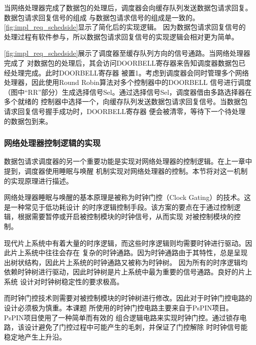 当网络处理器完成了数据包的处理后，调度器会向缓存队列发送数据包请求回复。数据包请求回复信号的组成
与数据包请求信号的组成是一致的。\autoref{fig:impl_req_schedside}显示了简化后的实现逻辑。
因为数据包请求回复信号的处理过程有软件参与，所以数据包请求回复信号的实现逻辑会相对更为简单。


\autoref{fig:impl_req_schedside}展示了调度器至缓存队列方向的信号通路。当网络处理器完成了
对数据包的处理后，其会访问DOORBELL寄存器来告知调度器数据包已经处理完成。此时DOORBELL寄存器
被置1。考虑到调度器会同时管理多个网络处理器，因此使用Round Robin算法对多个控制器中的DOORBELL
信号进行调度（图中“RR”部分）生成选择信号Sel。通过选择信号Sel，调度器借由多路选择器在多个就绪的
控制器中选择一个，向缓存队列发送数据包请求回复信号。当数据包请求回复信号握手成功时，DOORBELL寄存器
便会被清零，等待下一个待处理的数据包到来。

\subsubsection{网络处理器控制逻辑的实现}

数据包请求调度器的另一个重要功能是实现对网络处理器的控制逻辑。在上一章中提到，调度器使用睡眠与唤醒
机制实现对网络处理器的控制。本节将对这一机制的实现原理进行描述。


网络处理器睡眠与唤醒的基本原理是被称为时钟门控（Clock Gating）的技术。这是一种常见于低功耗设计
的时序逻辑控制手段。该方案的要点在于通过控制逻辑，根据需要暂停或开启被控制模块的时钟信号，从而实现
对被控制模块的控制。

现代片上系统中有着大量的时序逻辑，而这些时序逻辑则均需要时钟进行驱动。因此片上系统中往往会存在
复杂的时钟通路。因为时钟通路由于其特性，总是呈现出树状结构，因此片上系统的时钟通路又被称为时钟树。
因为所有的时序逻辑均依赖时钟树进行驱动，因此时钟树是片上系统中最为重要的信号通路。良好的片上系统
设计对时钟树稳定性的要求极高。


而时钟门控技术则需要对被控制模块的时钟树进行修改。因此对于时钟门控电路的设计必须极为慎重。本课题
所使用的时钟门控电路主要来自于PsPIN项目\cite{di2020pspin}。PsPIN项目使用了一种简单而有效的
组合逻辑电路来实现时钟门控。通过锁存电路，该设计避免了门控过程中可能产生的毛刺，并保证了门控解除
时时钟信号能稳定地产生上升沿。


